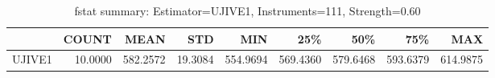 \begin{table}[ht]
\centering
\caption{fstat summary: Estimator=UJIVE1, Instruments=111, Strength=0.60}
\begin{tabular}{lrrrrrrrr}
\toprule
 & COUNT & MEAN & STD & MIN & 25\% & 50\% & 75\% & MAX \\
\midrule
UJIVE1 & 10.0000 & 582.2572 & 19.3084 & 554.9694 & 569.4360 & 579.6468 & 593.6379 & 614.9875 \\
\bottomrule
\end{tabular}
\end{table}
